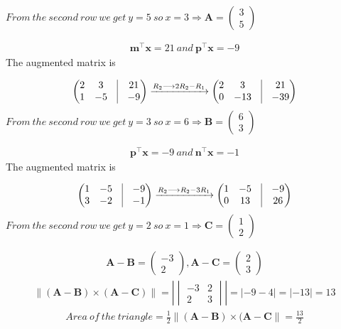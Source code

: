 \documentclass{beamer}
\theoremstyle{remark}
\providecommand{\norm}[1]{\lVert#1\rVert}
\newcommand{\myvec}[1]{\ensuremath{\begin{pmatrix}#1\end{pmatrix}}}
\newcommand{\mydet}[1]{\ensuremath{\begin{vmatrix}#1\end{vmatrix}}}
\let\vec\mathbf
\numberwithin{equation}{section}
\begin{document}
\begin{frame}
$ From \ the \ second \ row \ we \ get\ y=5 \ so \ x=3 \Longrightarrow
\vec{A} = \myvec{3\\5}$

\begin{align}
\vec{m}^\top\vec{x} = 21 \ and \ \vec{p}^\top\vec{x} = -9
\end{align}
The augmented matrix is

\begin{align}
\myvec{
2 & 3 &\vrule& 21\\
1 & -5 &\vrule& -9} \xrightarrow{R_2 \longrightarrow 2R_2-R_1}
\myvec{
2 & 3 &\vrule& 21\\
0 & -13 &\vrule& -39}
\end{align}
$ From \ the \ second \ row \ we \ get\ y=3 \ so \ x=6 \Longrightarrow
\vec{B} = \myvec{6\\3} $

\begin{align}
\vec{p}^\top\vec{x} = -9 \ and \ \vec{n}^\top\vec{x} = -1 
\end{align}
The augmented matrix is

\begin{align}
\myvec{
1 & -5 &\vrule& -9\\
3 & -2 &\vrule& -1} \xrightarrow{R_2 \longrightarrow R_2-3R_1}
\myvec{
1 & -5 &\vrule& -9\\
0 & 13 &\vrule& 26}
\end{align}
$ From \ the \ second \ row \ we \ get \ y=2 \ so \ x=1 \Longrightarrow
\vec{C} = \myvec{1\\2} $
\end{frame}
\begin{frame}
\begin{align}
\vec{A}-\vec{B} = \myvec{-3\\2} , \vec{A}-\vec{C} = \myvec{2\\3}   
\end{align}
\begin{align}
\norm{(\vec{A}-\vec{B})\times(\vec{A}-\vec{C})} =|\mydet{-3 & 2 \\
2 & 3}| = |-9-4| =|-13| = 13
\end{align}
\begin{align}
Area \ of \ the \ triangle = \frac{1}{2}{\norm{(\vec{A}-\vec{B})\times(\vec{A}-\vec{C}}}
                            =\frac{13}{2}
\end{align}

\end{frame}
\end{document}
